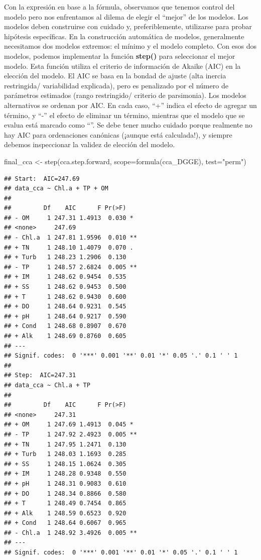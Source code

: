 \documentclass[
]{book}
\newenvironment{Shaded}{\begin{snugshade}}{\end{snugshade}}
\newcommand{\AttributeTok}[1]{\textcolor[rgb]{0.77,0.63,0.00}{#1}}
\newcommand{\FunctionTok}[1]{\textcolor[rgb]{0.00,0.00,0.00}{#1}}
\newcommand{\NormalTok}[1]{#1}
\newcommand{\OtherTok}[1]{\textcolor[rgb]{0.56,0.35,0.01}{#1}}
\newcommand{\StringTok}[1]{\textcolor[rgb]{0.31,0.60,0.02}{#1}}
\begin{document}
Con la expresión en base a la fórmula, observamos que tenemos control del modelo pero nos enfrentamos al dilema de elegir el ``mejor'' de los modelos.
Los modelos deben construirse con cuidado y, preferiblemente, utilizarse para probar
hipótesis específicas. En la construcción automática de modelos, generalmente necesitamos dos modelos extremos: el mínimo y el modelo completo. Con esos dos modelos, podemos implementar la función \textbf{step()} para seleccionar el mejor modelo. Esta función utiliza el criterio de información de Akaike (AIC) en la elección del modelo. El AIC se basa en la bondad de ajuste (alta inercia restringida/ variabilidad explicada), pero es penalizado por el número de parámetros estimados (rango restringido/ criterio de parsimonia). Los modelos alternativos se ordenan por AIC. En cada caso, ``+'' indica el efecto de agregar un término, y ``-'' el efecto de eliminar un término, mientras que el modelo que se evalua está marcado como ``''. Se debe tener mucho cuidado porque realmente no hay AIC para ordenaciones canónicas (¡aunque está calculada!), y siempre debemos inspeccionar la validez de elección del modelo.

\begin{Shaded}
\begin{Highlighting}[]
\NormalTok{final\_cca }\OtherTok{\textless{}{-}} \FunctionTok{step}\NormalTok{(cca.step.forward, }\AttributeTok{scope=}\FunctionTok{formula}\NormalTok{(cca\_DGGE), }\AttributeTok{test=}\StringTok{"perm"}\NormalTok{)}
\end{Highlighting}
\end{Shaded}

\begin{verbatim}
## Start:  AIC=247.69
## data_cca ~ Chl.a + TP + OM
## 
##         Df    AIC      F Pr(>F)   
## - OM     1 247.31 1.4913  0.030 * 
## <none>     247.69                 
## - Chl.a  1 247.81 1.9596  0.010 **
## + TN     1 248.10 1.4079  0.070 . 
## + Turb   1 248.23 1.2906  0.130   
## - TP     1 248.57 2.6824  0.005 **
## + IM     1 248.62 0.9454  0.535   
## + SS     1 248.62 0.9453  0.500   
## + T      1 248.62 0.9430  0.600   
## + DO     1 248.64 0.9231  0.545   
## + pH     1 248.64 0.9217  0.590   
## + Cond   1 248.68 0.8907  0.670   
## + Alk    1 248.69 0.8760  0.605   
## ---
## Signif. codes:  0 '***' 0.001 '**' 0.01 '*' 0.05 '.' 0.1 ' ' 1
## 
## Step:  AIC=247.31
## data_cca ~ Chl.a + TP
## 
##         Df    AIC      F Pr(>F)   
## <none>     247.31                 
## + OM     1 247.69 1.4913  0.045 * 
## - TP     1 247.92 2.4923  0.005 **
## + TN     1 247.95 1.2471  0.130   
## + Turb   1 248.03 1.1693  0.285   
## + SS     1 248.15 1.0624  0.305   
## + IM     1 248.28 0.9348  0.550   
## + pH     1 248.31 0.9083  0.610   
## + DO     1 248.34 0.8866  0.580   
## + T      1 248.49 0.7454  0.865   
## + Alk    1 248.59 0.6523  0.920   
## + Cond   1 248.64 0.6067  0.965   
## - Chl.a  1 248.92 3.4926  0.005 **
## ---
## Signif. codes:  0 '***' 0.001 '**' 0.01 '*' 0.05 '.' 0.1 ' ' 1
\end{verbatim}
\end{document}
